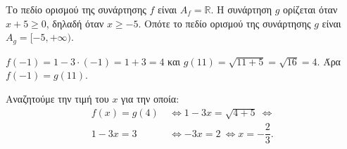 
\begin{alist}
\item Το πεδίο ορισμού της συνάρτησης $f$ είναι $A_f = \mathbb{R}$. Η συνάρτηση $g$ ορίζεται όταν
$x + 5 \ge 0$, δηλαδή όταν $x \ge -5$. Οπότε το πεδίο ορισμού της συνάρτησης $g$ είναι
$A_g = [-5, +\infty)$.

\item $f(-1) = 1 - 3 \cdot (-1) = 1 + 3 = 4$ και $g(11) = \sqrt{11 + 5} = \sqrt{16} = 4$.
Άρα $f(-1) = g(11)$.

\item Αναζητούμε την τιμή του $x$ για την οποία:
\begin{align*}
f(x) = g(4) \ &\Leftrightarrow 
1 - 3x = \sqrt{4 + 5} \ \Leftrightarrow \\
1 - 3x = 3 \ &\Leftrightarrow
-3x = 2 \ \Leftrightarrow x= -\dfrac{2}{3}.
\end{align*}
\end{alist}

